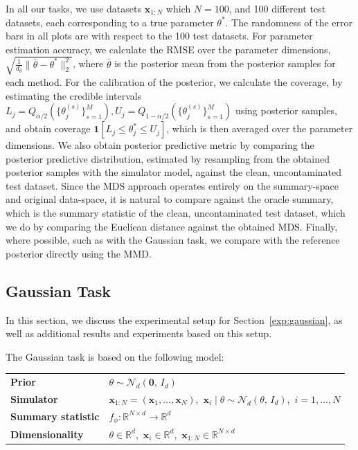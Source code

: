 \documentclass{article}
\theoremstyle{plain}
\theoremstyle{definition}
\theoremstyle{remark}
\begin{document}
In all our tasks, we use datasets \( \mathbf{x}_{1:N} \) which \( N= 100\), and 100 different test datasets, each corresponding to a true parameter \( \theta^* \). The randomness of the error bars in all plots are with respect to the 100 test datasets. For parameter estimation accuracy, we calculate the RMSE over the parameter dimensions, \( \sqrt{\frac{1}{d_\theta} \| \bar{\theta} - \theta^* \|^2_2} \), where \( \bar{\theta} \) is the posterior mean from the posterior samples for each method. For the calibration of the posterior, we calculate the coverage, by estimating the credible intervals \( L_j = Q_{\alpha/2}(\{\theta_j^{(s)}\}_{s=1}^M), U_j  = Q_{1-\alpha/2}(\{\theta_j^{(s)}\}_{s=1}^M)\) using posterior samples, and obtain coverage \( \mathbf{1}[L_j \leq \theta_j^* \leq U_j] \), which is then averaged over the parameter dimensions. We also obtain posterior predictive metric by comparing the posterior predictive distribution, estimated by resampling from the obtained posterior samples with the simulator model, against the clean, uncontaminated test dataset. Since the MDS approach operates entirely on the summary-space and original data-space, it is natural to compare against the oracle summary, which is the summary statistic of the clean, uncontaminated test dataset, which we do by comparing the Eucliean distance against the obtained MDS. Finally, where possible, such as with the Gaussian task, we compare with the reference posterior directly using the MMD.


\subsection{Gaussian Task}
\label{app:gauss}

In this section, we discuss the experimental setup for Section~\ref{exp:gaussian}, as well as additional results and experiments based on this setup.

The Gaussian task is based on the following model:

{\setlength{\extrarowheight}{5pt}
\begin{tabularx}{\textwidth}{@{}ll@{}}
    \textbf{Prior} &
        $\theta \sim \mathcal{N}_d(\mathbf{0},\, I_d)$
        \\
    \textbf{Simulator} &
        $\mathbf{x}_{1:N} = (\mathbf{x}_1,\ldots,\mathbf{x}_{N})$,\,
        $\mathbf{x}_i \mid \theta \sim \mathcal{N}_d(\theta,\, I_d)$,\,
        $i = 1,\ldots,N$
        \\
    \textbf{Summary statistic} &
        $f_\phi:\mathbb{R}^{N \times d} \to \mathbb{R}^d$
        \\
    \textbf{Dimensionality} &
        $\theta \in \mathbb{R}^{d}$,\,
        $\mathbf{x}_i \in \mathbb{R}^{d}$,\,
        $\mathbf{x}_{1:N} \in \mathbb{R}^{N\times d}$ \\
\end{tabularx}}
\end{document}
